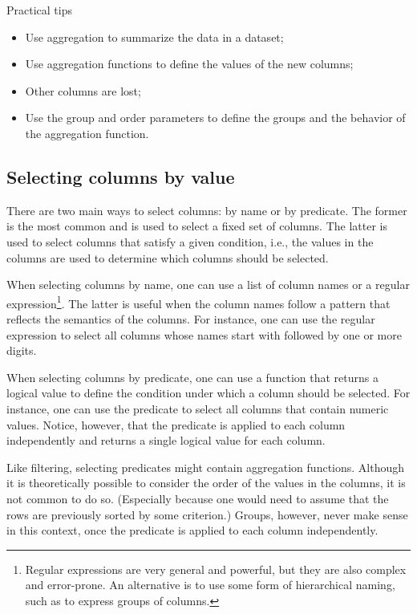 \begin{hlbox}{Practical tips}
  \begin{itemize}
    \item Use aggregation to summarize the data in a dataset;
    \item Use aggregation functions to define the values of the new columns;
    \item Other columns are lost;
    \item Use the group and order parameters to define the groups and the behavior of the
      aggregation function.
  \end{itemize}
\end{hlbox}


\subsection{Selecting columns by value}
\label{sub:selection-value}

There are two main ways to select columns: by name or by predicate.  The former is the
most common and is used to select a fixed set of columns.  The latter is used to select
columns that satisfy a given condition, i.e., the values in the columns are used to
determine which columns should be selected.

When selecting columns by name, one can use a list of column names or a regular
expression\footnote{Regular expressions are very general and powerful, but they are also
complex and error-prone.  An alternative is to use some form of hierarchical naming,
such as  to express groups of columns.}.
The latter is useful when the column names follow a pattern that reflects the semantics of
the columns.  For instance,
one can use the regular expression  to select all columns whose names
start with  followed by one or more digits.

When selecting columns by predicate, one can use a function that returns a logical value
to define the condition under which a column should be selected.  For instance, one can
use the predicate  to select all columns that contain numeric values.
Notice, however, that the predicate is applied to each column independently and returns a
single logical value for each column.

Like filtering, selecting predicates might contain aggregation functions.  Although it is
theoretically possible to consider the order of the values in the columns, it is not common
to do so.  (Especially because one would need to assume that the rows are previously
sorted by some criterion.) Groups, however, never make sense in this context, once the
predicate is applied to each column independently.

